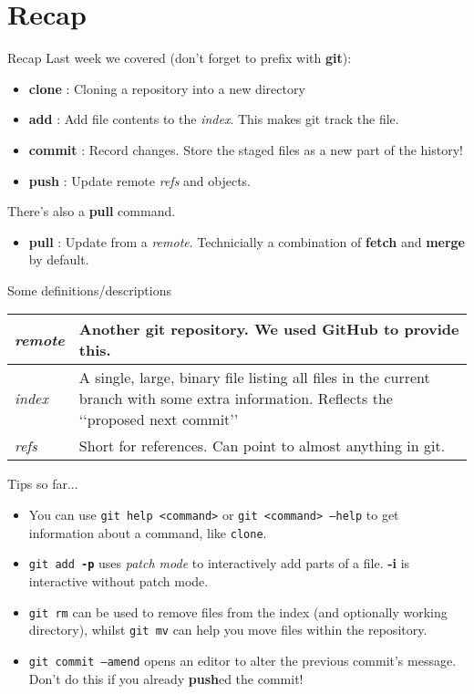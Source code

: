 \documentclass{beamer}
\begin{document}
\section{Recap}
\begin{frame}{Recap}
  Last week we covered (don't forget to prefix with \textbf{git}):
  \begin{itemize}
    \item \textbf{clone} : Cloning a repository into a new directory
    \item \textbf{add} : Add file contents to the \textit{index}. This makes git track the file.
    \item \textbf{commit} : Record changes. Store the staged files as a new part of the history!
    \item \textbf{push} : Update remote \textit{refs} and objects.
	\end{itemize}
	There\rq{}s also a \textbf{pull} command.
	\begin{itemize}
		\item \textbf{pull} : Update from a \textit{remote}. Technicially a combination of \textbf{fetch} and \textbf{merge} by default.
	\end{itemize}
\end{frame}

\begin{frame}{Some definitions/descriptions}
	\renewcommand{\arraystretch}{2.5}
	\begin{tabular}{m{}m{}}
	  \textit{remote} & Another git repository. \newline We used GitHub to provide this. \\
	  \hline
  		\textit{index} & A single, large, binary file listing all files in the current branch with some extra information. \newline Reflects the \lq\lq{}proposed next commit\rq\rq{} \\
  		\hline
	  \textit{refs} & Short for references. \newline Can point to almost anything in git.
  \end{tabular}
  	\renewcommand{\arraystretch}{1}
\end{frame}

\begin{frame}[fragile]{Tips so far...}
  \begin{itemize}
    \item You can use \texttt{git help <command>} or \texttt{git <command> --help} to get information about a command, like \texttt{clone}.
    \item \texttt{git add \textbf{-p}} uses \textit{patch mode} to interactively add parts of a file. \textbf{-i} is interactive without patch mode.
    \item \texttt{git rm} can be used to remove files from the index (and optionally working directory), whilst \texttt{git mv} can help you move files within the repository.
    \item \texttt{git commit --amend} opens an editor to alter the previous commit's message. Don't do this if you already \textbf{push}ed the commit!
  \end{itemize}
\end{frame}
\end{document}
